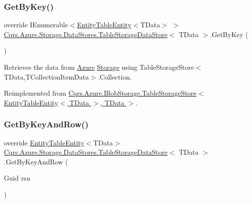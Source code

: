 \subsubsection{\texorpdfstring{Get\+By\+Key()}{GetByKey()}}
{\footnotesize\ttfamily override I\+Enumerable$<$\hyperlink{classCqrs_1_1Azure_1_1BlobStorage_1_1EntityTableEntity}{Entity\+Table\+Entity}$<$T\+Data$>$ $>$ \hyperlink{classCqrs_1_1Azure_1_1Storage_1_1DataStores_1_1TableStorageDataStore}{Cqrs.\+Azure.\+Storage.\+Data\+Stores.\+Table\+Storage\+Data\+Store}$<$ T\+Data $>$.Get\+By\+Key (\begin{DoxyParamCaption}{ }\end{DoxyParamCaption})\hspace{0.3cm}{\ttfamily [virtual]}}



Retrieves the data from \hyperlink{namespaceCqrs_1_1Azure}{Azure} \hyperlink{namespaceCqrs_1_1Azure_1_1Storage}{Storage} using Table\+Storage\+Store$<$\+T\+Data,\+T\+Collection\+Item\+Data$>$.\+Collection. 



Reimplemented from \hyperlink{classCqrs_1_1Azure_1_1BlobStorage_1_1TableStorageStore_a7a6e253d7d4f6d40a2b59e804f68c5c4_a7a6e253d7d4f6d40a2b59e804f68c5c4}{Cqrs.\+Azure.\+Blob\+Storage.\+Table\+Storage\+Store$<$ Entity\+Table\+Entity$<$ T\+Data $>$, T\+Data $>$}.

\mbox{\label{classCqrs_1_1Azure_1_1Storage_1_1DataStores_1_1TableStorageDataStore_a61e3fc6404283606ec41a5e5a3c72ac8_a61e3fc6404283606ec41a5e5a3c72ac8}} 
\subsubsection{\texorpdfstring{Get\+By\+Key\+And\+Row()}{GetByKeyAndRow()}}
{\footnotesize\ttfamily override \hyperlink{classCqrs_1_1Azure_1_1BlobStorage_1_1EntityTableEntity}{Entity\+Table\+Entity}$<$T\+Data$>$ \hyperlink{classCqrs_1_1Azure_1_1Storage_1_1DataStores_1_1TableStorageDataStore}{Cqrs.\+Azure.\+Storage.\+Data\+Stores.\+Table\+Storage\+Data\+Store}$<$ T\+Data $>$.Get\+By\+Key\+And\+Row (\begin{DoxyParamCaption}\item[{Guid}]{rsn }\end{DoxyParamCaption})\hspace{0.3cm}{\ttfamily [virtual]}}



